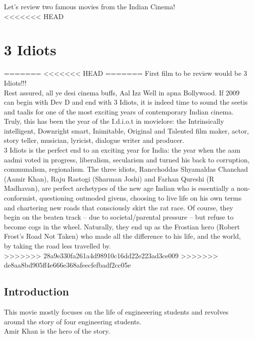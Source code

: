 \documentclass{article}
\begin{document}
Let's review two famous movies from the Indian Cinema!\\
<<<<<<< HEAD
\section{3 Idiots}
=======
<<<<<<< HEAD
=======
First film to be  review would be 3 Idiots!!! \\
Rest assured, all ye desi cinema buffs, Aal Izz Well in apna Bollywood. If 2009 can begin with Dev D and end with 3 Idiots, it is indeed time to sound the seetis and taalis for one of the most exciting years of contemporary Indian cinema. Truly, this has been the year of the I.d.i.o.t in movielore: the Intrinsically intelligent, Downright smart, Inimitable, Original and Talented film maker, actor, story teller, musician, lyricist, dialogue writer and producer.\\

3 Idiots is the perfect end to an exciting year for India: the year when the aam aadmi voted in progress, liberalism, secularism and turned his back to corruption, communalism, regionalism. The three idiots, Rancchoddas Shyamaldas Chanchad (Aamir Khan), Raju Rastogi (Sharman Joshi) and Farhan Qureshi (R Madhavan), are perfect archetypes of the new age Indian who is essentially a non-conformist, questioning outmoded givens, choosing to live life on his own terms and chartering new roads that consciously skirt the rat race. Of course, they begin on the beaten track -- due to societal/parental pressure -- but refuse to become cogs in the wheel. Naturally, they end up as the Frostian hero (Robert Frost's Road Not Taken) who made all the difference to his life, and the world, by taking the road less travelled by.\\

>>>>>>> 28a9e330fa261a4d98910c16dd22e223ad3ce009
>>>>>>> de8aa8bd905ff4e666e368afeecfefbadf2cc05e

\subsection{Introduction}
This movie mostly focuses on the life of engineeering students and revolves around the story of four engineering students. \\
Amir Khan is the hero of the story. \\
\end{document}
